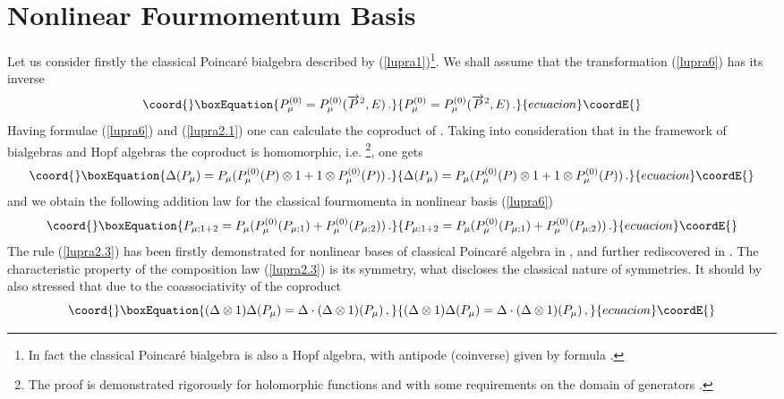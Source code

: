 \documentclass[a4paper,a4paper]{article}
\begin{document}
\section{Nonlinear Fourmomentum Basis}
\setcounter{equation}{0}

Let us consider firstly the classical    Poincar\'{e}  bialgebra
described by (\ref{lupra1})\footnote{In fact the classical
Poincar\'{e}  bialgebra is also a Hopf algebra, with antipode
(coinverse) given by formula \coordHE{}.}. We shall assume
that the transformation (\ref{lupra6}) has its inverse
\begin{equation}\coord{}\boxEquation{\label{lupra2.1}
  P^{(0)}_\mu = P^{(0)}_\mu ( \overrightarrow{P}^2 , E )\, .
}{P^{(0)}_\mu = P^{(0)}_\mu ( \overrightarrow{P}^2 , E )\, .
}{ecuacion}\coordE{}\end{equation}
Having formulae (\ref{lupra6}) and (\ref{lupra2.1}) one can
calculate the coproduct of \coordHE{}. Taking into consideration that
in the framework of bialgebras and Hopf algebras the coproduct is
homomorphic, i.e. \coordHE{}\footnote{The
proof is demonstrated rigorously for holomorphic functions \coordHE{} and
with some requirements on the domain of generators \coordHE{}.}, one
gets
\begin{equation}\coord{}\boxEquation{\label{lupra2.2}
  \Delta( P_\mu ) = P_\mu    (P^{(0)}_\mu (P)\otimes 1 + 1 \otimes
  P^{(0)}_\mu (P))\, .
}{\Delta( P_\mu ) = P_\mu    (P^{(0)}_\mu (P)\otimes 1 + 1 \otimes
  P^{(0)}_\mu (P))\, .
}{ecuacion}\coordE{}\end{equation}
and we obtain the following addition law for the classical
fourmomenta in nonlinear basis (\ref{lupra6})
\begin{equation}\coord{}\boxEquation{\label{lupra2.3}
  P_{\mu;1+2} = P_\mu (P^{(0)}_\mu (P_{\mu;1}) + P^{(0)}_\mu
  (P_{\mu;2}))\, .
}{P_{\mu;1+2} = P_\mu (P^{(0)}_\mu (P_{\mu;1}) + P^{(0)}_\mu
  (P_{\mu;2}))\, .
}{ecuacion}\coordE{}\end{equation}
The rule (\ref{lupra2.3}) has been firstly demonstrated for
nonlinear bases of classical Poincar\'{e} algebra in  \cite{ln2},
and further rediscovered in \cite{jv}. The characteristic property
of the composition law (\ref{lupra2.3}) is its symmetry, what
discloses the classical nature of symmetries. It should by also
stressed that due to the  coassociativity  of the coproduct
\begin{equation}\coord{}\boxEquation{\label{lupra2.4}
  (\Delta \otimes 1) \Delta(P_{\mu}) = \Delta \cdot (\Delta
  \otimes 1)(P_\mu )\, ,
}{(\Delta \otimes 1) \Delta(P_{\mu}) = \Delta \cdot (\Delta
  \otimes 1)(P_\mu )\, ,
}{ecuacion}\coordE{}\end{equation}
\end{document}
